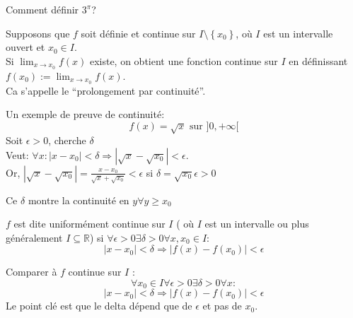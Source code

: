 \documentclass[../main.tex]{subfiles}
\begin{document}
Comment définir $3^{\pi}$?\\
\begin{exemple}
	Supposons que $f$ soit définie et continue sur $I \setminus \left\{ x_0 \right\} $, où $I$ est un intervalle ouvert et $x_0\in I$.\\
	Si $ \lim_{x \to x_0} f( x) $ existe, on obtient une fonction continue sur $I$ en définissant $f( x_0) := \lim_{x \to x_0} f( x) $.\\
	Ca s'appelle le ``prolongement par continuité''.
\end{exemple}
Un exemple de preuve de continuité:\\
\[ 
	f( x)  =\sqrt{x } \text{ sur } ]0,+ \infty[
\]
Soit $\epsilon> 0$, cherche $\delta$ \\
Veut: $\forall x: |x-x_0| <\delta \Rightarrow  | \sqrt{x} - \sqrt{x_0}|< \epsilon$.\\
Or, $|\sqrt{x} - \sqrt{x_0}| = \frac{x -x_0}{\sqrt{x} + \sqrt{x_0}} < \epsilon$ si $\delta = \sqrt{x_0} \epsilon> 0$
\begin{rmq}
Ce $\delta$ montre la continuité en $y \forall y \geq x_0$
\end{rmq}
\begin{defn}
	$f$ est dite uniformément continue sur $I$ ( où $I$ est un intervalle ou plus généralement $I \subseteq \mathbb{R}$) si $\forall \epsilon > 0 \exists \delta> 0 \forall x, x_0 \in I$:
	\[ 
		|x- x_0| < \delta \Rightarrow  |f( x) - f( x_0) | < \epsilon
	\]
	
\end{defn}
Comparer à $f$ continue sur $I$ :
\[ 
\forall x_0 \in I \forall \epsilon > 0 \exists \delta > 0 \forall x: 
\]
\[ 
	|x-x_0| < \delta \Rightarrow |f( x) - f( x_0) | < \epsilon
\]
Le point clé est que le delta dépend que de $\epsilon$ et pas de $x_0$.
\end{document}
